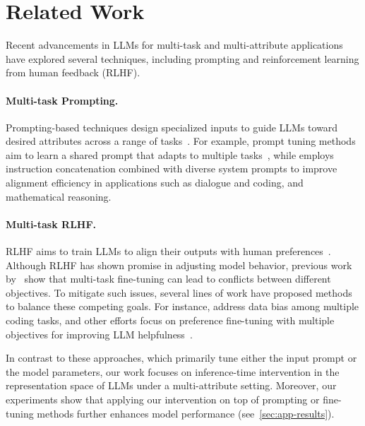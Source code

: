 \section{Related Work}
Recent advancements in LLMs for multi-task and multi-attribute applications have explored several techniques, including prompting and reinforcement learning from human feedback (RLHF). 

\paragraph{Multi-task Prompting.} Prompting-based techniques design specialized inputs to guide LLMs toward desired attributes across a range of tasks~\citep{ref:li2021prefix, ref:qin2021learning, ref:prasad2023grips}. For example, prompt tuning methods aim to learn a shared prompt that adapts to multiple tasks~\citep{ref:liu2023hierarchical, ref:tian2024argue, ref:kim2024aapl}, while \citet{ref:xu2025mixture} employs instruction concatenation combined with diverse system prompts to improve alignment efficiency in applications such as dialogue and coding, and mathematical reasoning.

\paragraph{Multi-task RLHF.} RLHF aims to train LLMs to align their outputs with human preferences~\citep{ref:ouyang2022training, ref:rafailov2024direct}. Although RLHF has shown promise in adjusting model behavior, previous work by~\citet{ref:dong2023abilities, ref:kotha2024understanding, ref:biderman2024lora} show that multi-task fine-tuning can lead to conflicts between different objectives. To mitigate such issues, several lines of work have proposed methods to balance these competing goals. For instance, \citet{ref:liu2024mftcoder} address data bias among multiple coding tasks, and other efforts focus on preference fine-tuning with multiple objectives for improving LLM helpfulness~\citep{ref:wu2023finegrained, ref:zhang2024bi, ref:yang2024metaaligner, ref:wang2024arithmetic, ref:yang2024rewards, ref:wang2024interpretable}.

In contrast to these approaches, which primarily tune either the input prompt or the model parameters, our work focuses on inference-time intervention in the representation space of LLMs under a multi-attribute setting. 
Moreover, our experiments show that applying our intervention on top of prompting or fine-tuning methods further enhances model performance (see~\cref{sec:app-results}).